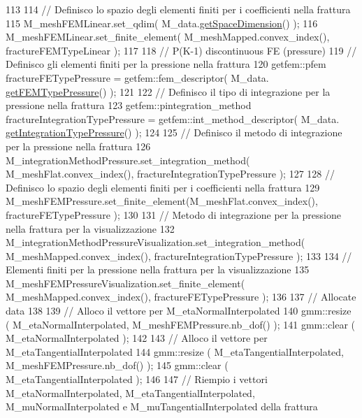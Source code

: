 \begin{DoxyCode}
113 
114     \textcolor{comment}{// Definisco lo spazio degli elementi finiti per i coefficienti nella frattura}
115     M\_meshFEMLinear.set\_qdim( M\_data.\hyperlink{classFractureData_a4ead03266295fe14fa3285692f945d89}{getSpaceDimension}() );
116     M\_meshFEMLinear.set\_finite\_element( M\_meshMapped.convex\_index(), fractureFEMTypeLinear );
117 
118     \textcolor{comment}{// P(K-1) discontinuous FE (pressure)}
119     \textcolor{comment}{// Definisco gli elementi finiti per la pressione nella frattura}
120     getfem::pfem fractureFETypePressure = getfem::fem\_descriptor( M\_data.
      \hyperlink{classFractureData_a643b9a8a33405ec7aaa6b5612cb81d57}{getFEMTypePressure}() );
121 
122     \textcolor{comment}{// Definisco il tipo di integrazione per la pressione nella frattura}
123     getfem::pintegration\_method fractureIntegrationTypePressure = getfem::int\_method\_descriptor( M\_data.
      \hyperlink{classFractureData_a9333d8e89dc92023d97a48c1905ada76}{getIntegrationTypePressure}() );
124 
125     \textcolor{comment}{// Definisco il metodo di integrazione per la pressione nella frattura}
126     M\_integrationMethodPressure.set\_integration\_method( M\_meshFlat.convex\_index(), 
      fractureIntegrationTypePressure );
127 
128     \textcolor{comment}{// Definisco lo spazio degli elementi finiti per i coefficienti nella frattura}
129     M\_meshFEMPressure.set\_finite\_element(M\_meshFlat.convex\_index(), fractureFETypePressure );
130 
131     \textcolor{comment}{// Metodo di integrazione per la pressione nella frattura per la visualizzazione}
132     M\_integrationMethodPressureVisualization.set\_integration\_method( M\_meshMapped.convex\_index(), 
      fractureIntegrationTypePressure );
133 
134     \textcolor{comment}{// Elementi finiti per la pressione nella frattura per la visualizzazione}
135     M\_meshFEMPressureVisualization.set\_finite\_element( M\_meshMapped.convex\_index(), fractureFETypePressure 
      );
136 
137     \textcolor{comment}{// Allocate data}
138 
139     \textcolor{comment}{// Alloco il vettore per M\_etaNormalInterpolated}
140     gmm::resize ( M\_etaNormalInterpolated, M\_meshFEMPressure.nb\_dof() );
141     gmm::clear ( M\_etaNormalInterpolated );
142 
143     \textcolor{comment}{// Alloco il vettore per M\_etaTangentialInterpolated}
144     gmm::resize ( M\_etaTangentialInterpolated, M\_meshFEMPressure.nb\_dof() );
145     gmm::clear ( M\_etaTangentialInterpolated );
146 
147     \textcolor{comment}{// Riempio i vettori M\_etaNormalInterpolated, M\_etaTangentialInterpolated, M\_muNormalInterpolated e
       M\_muTangentialInterpolated della frattura}

\end{DoxyCode}
